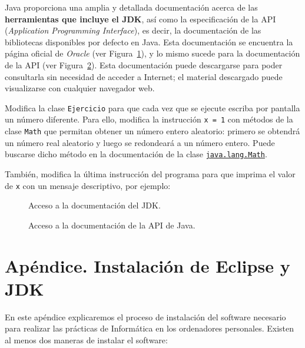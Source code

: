 \documentclass[
  spanish,
  11pt,
  a4paper,
  DIV=11,
  numbers=noendperiod]{scrartcl}
\begin{document}
Java proporciona una amplia y detallada documentación acerca de las \textbf{herramientas que incluye el JDK}, así como la especificación de la API (\emph{Application Programming Interface}), es decir, la documentación de las bibliotecas disponibles por defecto en Java. Esta documentación se encuentra la página oficial de \emph{Oracle} (ver Figura~\ref{fig-jdk_doc}), y lo mismo sucede para la documentación de la API (ver Figura~\ref{fig-api_doc}). Esta documentación puede descargarse para poder consultarla sin necesidad de acceder a Internet; el material descargado puede visualizarse con cualquier navegador web.

Modifica la clase \texttt{Ejercicio} para que cada vez que se ejecute escriba por pantalla un número diferente. Para ello, modifica la instrucción \texttt{x\ =\ 1} con métodos de la clase \texttt{Math} que permitan obtener un número entero aleatorio: primero se obtendrá un número real aleatorio y luego se redondeará a un número entero. Puede buscarse dicho método en la documentación de la clase \href{https://docs.oracle.com/en/java/javase/25/docs/api/java.base/java/lang/Math.html}{\texttt{java.lang.Math}}.


También, modifica la última instrucción del programa para que imprima el valor de \texttt{x} con un mensaje descriptivo, por ejemplo:


\begin{figure}
\caption{Acceso a la documentación del JDK.}\label{fig-jdk_doc}
\end{figure}

\begin{figure}
\caption{Acceso a la documentación de la API de Java.}\label{fig-api_doc}
\end{figure}

\section{Apéndice. Instalación de Eclipse y JDK}\label{appendix-installation}

En este apéndice explicaremos el proceso de instalación del software necesario para realizar las prácticas de Informática en los ordenadores personales. Existen al menos dos maneras de instalar el software:
\end{document}
